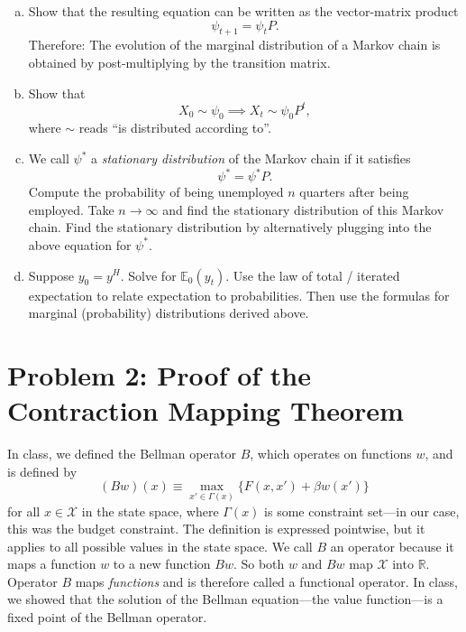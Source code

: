 \documentclass[11pt]{extarticle}
\theoremstyle{plain}
\theoremstyle{definition}
\begin{document}
\begin{enumerate}[(a)]
\item Show that the resulting equation can be written as the vector-matrix product
\begin{equation*}
	\psi_{t+1} = \psi_t P.
\end{equation*}
Therefore: The evolution of the marginal distribution of a Markov chain is obtained by post-multiplying by the transition matrix. 

\item Show that
\begin{equation*}
	X_0 \sim \psi_0 \implies X_t \sim \psi_0 P^t,
\end{equation*}
where $\sim$ reads ``is distributed according to''. 

\item We call $\psi^*$ a \textit{stationary distribution} of the Markov chain if it satisfies 
\begin{equation*}
	\psi^* = \psi^* P.
\end{equation*}
Compute the probability of being unemployed $n$ quarters after being employed. Take $n \to \infty$ and find the stationary distribution of this Markov chain. Find the stationary distribution by alternatively plugging into the above equation for $\psi^*$. 

\item Suppose $y_0 = y^H$. Solve for $\mathbb E_0 (y_t)$. Use the law of total / iterated expectation to relate expectation to probabilities. Then use the formulas for marginal (probability) distributions derived above. 
\end{enumerate}



\vspace{5mm}
\section*{Problem 2: Proof of the Contraction Mapping Theorem}

In class, we defined the Bellman operator $B$, which operates on functions $w$, and is defined by
\begin{equation*}
	(Bw)(x) \equiv \max_{x' \in \Gamma(x)} \bigg\{ F(x, x') + \beta w(x') \bigg\}
\end{equation*}
for all $x \in \mathcal X$ in the state space, where $\Gamma(x)$ is some constraint set---in our case, this was the budget constraint. The definition is expressed pointwise, but it applies to all possible values in the state space. We call $B$ an operator because it maps a function $w$ to a new function $Bw$. So both $w$ and $Bw$ map $\mathcal X$ into $\mathbb R$. Operator $B$ maps \textit{functions} and is therefore called a functional operator. In class, we showed that the solution of the Bellman equation---the value function---is a fixed point of the Bellman operator.
\end{document}

